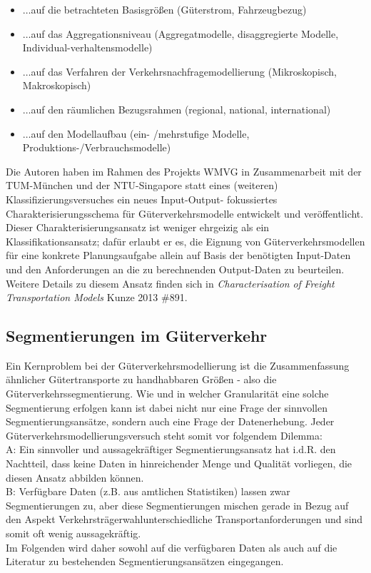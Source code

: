\begin{itemize}
%
   \item $\ldots$auf die betrachteten Basisgrößen (Güterstrom, Fahrzeugbezug)
   \item $\ldots$auf das Aggregationsniveau (Aggregatmodelle, disaggregierte Modelle, Individual-verhaltensmodelle)
   \item $\ldots$auf das Verfahren der Verkehrsnachfragemodellierung (Mikroskopisch, Makroskopisch)
   \item $\ldots$auf den räumlichen Bezugsrahmen (regional, national, international)
   \item $\ldots$auf den Modellaufbau (ein- /mehrstufige Modelle, Produktions-/Verbrauchsmodelle)
%
\end{itemize}
Die Autoren haben im Rahmen des Projekts WMVG in Zusammenarbeit mit der TUM-München und der NTU-Singapore statt eines (weiteren) Klassifizierungsversuches ein neues Input-Output- fokussiertes Charakterisierungsschema für Güterverkehrsmodelle entwickelt und veröffentlicht. Dieser Charakterisierungsansatz ist weniger ehrgeizig als ein Klassifikationsansatz; dafür erlaubt er es, die Eignung von Güterverkehrsmodellen für eine konkrete Planungsaufgabe allein auf Basis der benötigten Input-Daten und den Anforderungen an die zu berechnenden Output-Daten zu beurteilen. Weitere Details zu diesem Ansatz finden sich in \emph{Characterisation}\emph{ }\emph{of}\emph{ }\emph{Freight}\emph{ Transportation Models} {Kunze 2013 \#891}.~\\


% 
\subsection{Segmentierungen im Güterverkehr}
\label{_Toc365801594}
\label{_Ref365822342}
\label{_Toc366766088}
\label{_Toc366775282}
\label{_Ref364884153}
\label{_Ref364897372}
Ein Kernproblem bei der Güterverkehrsmodellierung ist die Zusammenfassung ähnlicher Gütertransporte zu handhabbaren Größen - also die Güterverkehrssegmentierung. Wie und in welcher Granularität eine solche Segmentierung erfolgen kann ist dabei nicht nur eine Frage der sinnvollen Segmentierungsansätze, sondern auch eine Frage der Datenerhebung. Jeder Güterverkehrsmodellierungsversuch steht somit vor folgendem Dilemma:~\\
A: Ein sinnvoller und aussagekräftiger Segmentierungsansatz hat i.d.R. den Nachtteil, dass keine Daten in hinreichender Menge und Qualität vorliegen, die diesen Ansatz abbilden können.~\\
B: Verfügbare Daten (z.B. aus amtlichen Statistiken) lassen zwar Segmentierungen zu, aber diese Segmentierungen mischen gerade in Bezug auf den Aspekt \glqq Verkehrsträgerwahl\grqq  unterschiedliche Transportanforderungen und sind somit oft wenig aussagekräftig.~\\
Im Folgenden wird daher sowohl auf die verfügbaren Daten als auch auf die Literatur zu bestehenden Segmentierungsansätzen eingegangen.~\\


